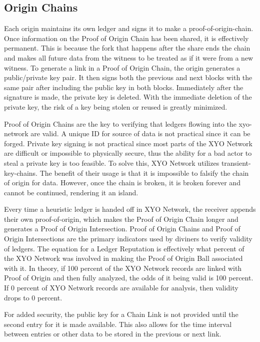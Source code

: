 \documentclass{article}
\begin{document}
\subsection{Origin Chains}

Each origin maintains its own ledger and signs it to make a \Gls{proof-of-origin-chain}. Once information on the Proof of Origin Chain has been shared, it is effectively permanent. This is because the fork that happens after the share ends the chain and makes all future data from the witness to be treated as if it were from a new witness. To generate a link in a Proof of Origin Chain, the origin generates a public/private key pair. It then signs both the previous and next blocks with the same pair after including the public key in both blocks. Immediately after the signature is made, the private key is deleted. With the immediate deletion of the private key, the risk of a key being stolen or reused is greatly minimized.

Proof of Origin Chains are the key to verifying that ledgers flowing into the \Gls{xyo-network} are valid. A unique ID for source of data is not practical since it can be forged. Private key signing is not practical since most parts of the XYO Network are difficult or impossible to physically secure, thus the ability for a bad actor to steal a private key is too feasible. To solve this, XYO Network utilizes \Glspl{transient-key-chain}. The benefit of their usage is that it is impossible to falsify the chain of origin for data. However, once the chain is broken, it is broken forever and cannot be continued, rendering it an island.

Every time a \gls{heuristic} ledger is handed off in XYO Network, the receiver appends their own \Gls{proof-of-origin}, which makes the Proof of Origin Chain longer and generates a Proof of Origin Intersection. Proof of Origin Chains and Proof of Origin Intersections are the primary indicators used by \Glspl{diviner} to verify validity of ledgers. The equation for a Ledger Reputation is effectively what percent of the XYO Network was involved in making the Proof of Origin Ball associated with it. In theory, if 100 percent of the XYO Network records are linked with Proof of Origin and then fully analyzed, the odds of it being valid is 100 percent. If 0 percent of XYO Network records are available for analysis, then validity drops to 0 percent.

For added security, the public key for a Chain Link is not provided until the second entry for it is made available. This also allows for the time interval between entries or other data to be stored in the previous or next link.
\end{document}
